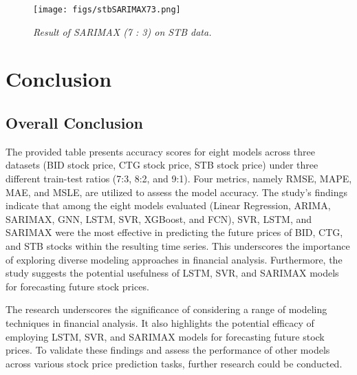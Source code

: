 \documentclass{ieeeojies}
\begin{document}
\begin{figure}[H]
    \centering
    \texttt{[image: figs/stbSARIMAX73.png]}
    \caption{\centering \textit{Result of SARIMAX (7 : 3) on STB data.}}
    \label{fig:enter-label}
\end{figure}
\section{\centering Conclusion}
\subsection{\textbf{Overall Conclusion}}
\hspace{0.3cm}The provided table presents accuracy scores for eight models across three datasets (BID stock price, CTG stock price, STB stock price) under three different train-test ratios (7:3, 8:2, and 9:1). Four metrics, namely RMSE, MAPE, MAE, and MSLE, are utilized to assess the model accuracy. The study's findings indicate that among the eight models evaluated (Linear Regression, ARIMA, SARIMAX, GNN, LSTM, SVR, XGBoost, and FCN), SVR, LSTM, and SARIMAX were the most effective in predicting the future prices of BID, CTG, and STB stocks within the resulting time series. This underscores the importance of exploring diverse modeling approaches in financial analysis. Furthermore, the study suggests the potential usefulness of LSTM, SVR, and SARIMAX models for forecasting future stock prices.

The research underscores the significance of considering a range of modeling techniques in financial analysis. It also highlights the potential efficacy of employing LSTM, SVR, and SARIMAX models for forecasting future stock prices. To validate these findings and assess the performance of other models across various stock price prediction tasks, further research could be conducted.
\end{document}
